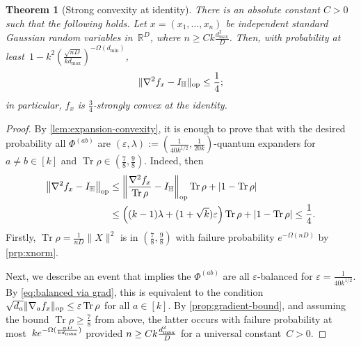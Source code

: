 \documentclass[aos]{imsart}
\newtheorem{theorem}{Theorem}[section]
\theoremstyle{definition}
\numberwithin{equation}{section}
\DeclareMathOperator{\op}{op}
\DeclareMathOperator{\tr}{Tr}
\DeclarePairedDelimiter{\abs}{\lvert}{\rvert}
\DeclarePairedDelimiter{\norm}{\lVert}{\rVert}
\newcommand{\R}{{\mathbb{R}}}
\renewcommand{\H}{{\mathbb{H}}}
\newcommand{\eps}{\varepsilon}
\newcommand{\rv}{x}
\begin{document}
\begin{theorem}[Strong convexity at identity]\label{thm:tensor-convexity}
There is an absolute constant $C>0$ such that the following holds.
Let $x = (x_1,\dots,x_n)$ be independent standard Gaussian random variables in~$\R^D$, where $n \geq C k \frac{d_{\max}^2}D$.
Then, with probability at least~$1 - k^2 ( \frac{\sqrt{nD}}{k d_{\max}} )^{-\Omega(d_{\min})}$,
\begin{align*}
  \norm{\nabla^2 f_x - I_\H}_{\op} \leq \frac14;
\end{align*}
in particular, $f_x$ is $\frac34$-strongly convex at the identity.
\end{theorem}
\begin{proof}
By \cref{lem:expansion-convexity}, it is enough to prove that with the desired probability all $\Phi^{(ab)}$ are $(\eps,\lambda):=(\frac1{40 k^{1/2}},\frac1{20k})$-quantum expanders for $a\neq b\in[k]$ and $\tr \rho \in (\frac78,\frac98)$.
Indeed, then
\begin{align*}
  \norm*{\nabla^2 f_x - I_\H}_{\op}
&\leq \norm*{\frac{\nabla^2 f_x}{\tr \rho} - I_\H}_{\op} \tr \rho + \abs{1 - \tr\rho} \\
&\leq \left( (k-1)\lambda + (1 + \sqrt k) \eps \right) \tr\rho + \abs{1 - \tr\rho}
\leq \frac14.
\end{align*}
Firstly, $\tr \rho = \frac{1}{nD} \|X\|^2$ is in $(\frac78, \frac98)$ with failure probability $e^{-\Omega(nD)}$ by \cref{prp:xnorm}.

Next, we describe an event that implies the $\Phi^{(ab)}$ are all $\eps$-balanced for $\eps=\frac1{40k^{1/2}}$.
By \cref{eq:balanced via grad}, this is equivalent to the condition $\sqrt{d_a} \norm{\nabla_a f_{\rv}}_{\op} \leq \eps \tr \rho$ for all $a \in [k]$.
By \cref{prop:gradient-bound}, and assuming the bound $\tr \rho \geq \frac78$ from above, the latter occurs with failure probability at most~$k \smash{e^{-\Omega(\frac{nD}{k d_{\max}})}}$ provided $n \geq C k \smash{\frac{d_{\max}^2}D}$ for a universal constant~$C>0$.


\end{proof}
\end{document}
